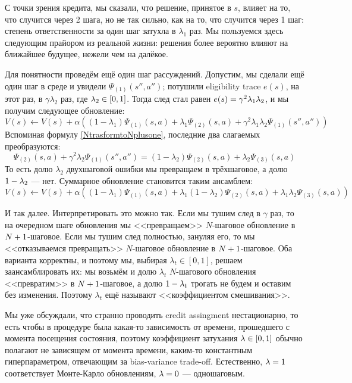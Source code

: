 С точки зрения кредита, мы сказали, что решение, принятое в $s$, влияет на то, что случится через 2 шага, но не так сильно, как на то, что случится через 1 шаг: степень ответственности за один шаг затухла в $\lambda_1$ раз. Мы пользуемся здесь следующим прайором из реальной жизни: решения более вероятно влияют на ближайшее будущее, нежели чем на далёкое.

Для понятности проведём ещё один шаг рассуждений. Допустим, мы сделали ещё один шаг в среде и увидели $\Psi_{(1)}(s'', a'')$; потушили eligibility trace $e(s)$, на этот раз, в $\gamma \lambda_2$ раз, где $\lambda_2 \HM \in [0, 1]$. Тогда след стал равен $e(s) \HM= \gamma^2 \lambda_1 \lambda_2$, и мы получим следующее обновление:
$$V(s) \leftarrow V(s) + \alpha \left( (1 - \lambda_1) \Psi_{(1)}(s, a) + \lambda_1 \Psi_{(2)}(s, a) + \gamma^2 \lambda_1 \lambda_2 \Psi_{(1)}(s'', a'') \right)$$
Вспоминая формулу \eqref{NtrasformtoNplusone}, последние два слагаемых преобразуются:
$$\Psi_{(2)}(s, a) + \gamma^2 \lambda_2 \Psi_{(1)}(s'', a'') = (1 - \lambda_2) \Psi_{(2)}(s, a) + \lambda_2 \Psi_{(3)}(s, a)$$
То есть долю $\lambda_2$ двухшаговой ошибки мы превращаем в трёхшаговое, а долю $1 \HM- \lambda_2$ --- нет. Суммарное обновление становится таким ансамблем:
$$V(s) \leftarrow V(s) + \alpha \left( (1 - \lambda_1) \Psi_{(1)}(s, a) + \lambda_1 (1 - \lambda_2) \Psi_{(2)}(s, a) + \lambda_1 \lambda_2 \Psi_{(3)}(s, a) \right)$$

И так далее. Интерпретировать это можно так. Если мы тушим след в $\gamma$ раз, то на очередном шаге обновления мы <<превращаем>> $N$-шаговое обновление в $N \HM+ 1$-шаговое. Если мы тушим след полностью, зануляя его, то мы <<отказываемся превращать>> $N$-шаговое обновление в $N \HM+ 1$-шаговое. Оба варианта корректны, и поэтому мы, выбирая $\lambda_t \in [0, 1]$, решаем заансамблировать их: мы возьмём и долю $\lambda_t$ $N$-шагового обновления <<превратим>> в $N \HM+ 1$-шаговое, а долю $1 \HM- \lambda_t$ трогать не будем и оставим без изменения. Поэтому $\lambda_t$ ещё называют <<коэффициентом смешивания>>.

Мы уже обсуждали, что странно проводить credit assingment нестационарно, то есть чтобы в процедуре была какая-то зависимость от времени, прошедшего с момента посещения состояния, поэтому коэффициент затухания $\lambda \HM\in [0, 1]$ обычно полагают не зависящем от момента времени, каким-то константным гиперпараметром, отвечающим за bias-variance trade-off. Естественно, $\lambda \HM= 1$ соответствует Монте-Карло обновлениям, $\lambda \HM= 0$ --- одношаговым.

